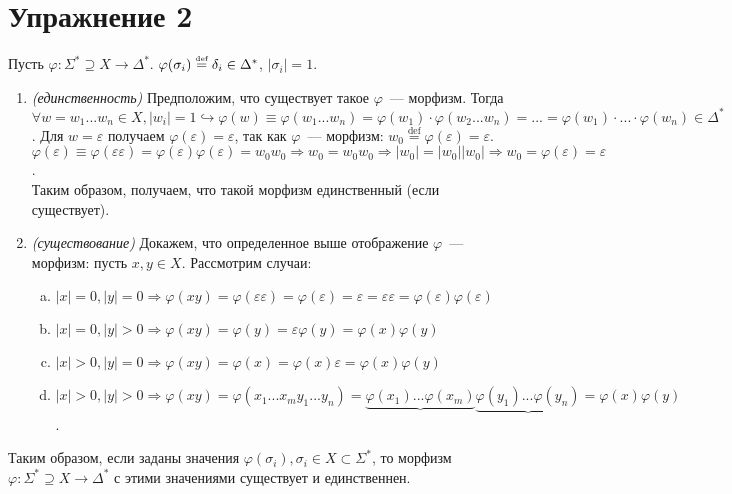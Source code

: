 \documentclass[a4paper]{article}
\begin{document}
\section*{Упражнение 2}
Пусть $\varphi\colon\Sigma^*\supseteq X\longrightarrow\Delta^*$. $\varphi(\sigma_i)\overset{\mbox{\tiny def}}{=}\delta_i\in\Delta^*$, $|\sigma_i|=1$.\newline
\begin{enumerate}
\item {\em (единственность)} Предположим, что существует такое $\varphi$~--- морфизм. Тогда $\forall w=w_1...w_n\in X, |w_i|=1\hookrightarrow\varphi(w)\equiv \varphi(w_1...w_n)=\varphi(w_1)\cdot\varphi(w_2...w_n)=...=\varphi(w_1)\cdot...\cdot\varphi(w_n)\in\Delta^*$. Для $w=\varepsilon$ получаем $\varphi(\varepsilon)=\varepsilon$, так как $\varphi$~--- морфизм: $w_0\overset{\mathrm{def}}{=}\varphi(\varepsilon)=\varepsilon$. $\varphi(\varepsilon)\equiv\varphi(\varepsilon\varepsilon)=\varphi(\varepsilon)\varphi(\varepsilon)=w_0w_0\Rightarrow w_0=w_0w_0\Rightarrow |w_0|=|w_0||w_0|\Rightarrow w_0=\varphi(\varepsilon)=\varepsilon$.
\\[5pt]
Таким образом, получаем, что такой морфизм единственный (если существует).
\item {\em (существование)} Докажем, что определенное выше отображение $\varphi$~--- морфизм: пусть $x,y\in X$. Рассмотрим случаи:
\begin{enumerate}[a.]
\item $|x|=0,|y|=0\Rightarrow\varphi(xy)=\varphi(\varepsilon\varepsilon)=\varphi(\varepsilon)=\varepsilon=\varepsilon\varepsilon=\varphi(\varepsilon)\varphi(\varepsilon)$
\item $|x|=0,|y|>0\Rightarrow\varphi(xy)=\varphi(y)=\varepsilon\varphi(y)=\varphi(x)\varphi(y)$
\item $|x|>0,|y|=0\Rightarrow\varphi(xy)=\varphi(x)=\varphi(x)\varepsilon=\varphi(x)\varphi(y)$
\item $|x|>0,|y|>0\Rightarrow\varphi(xy)=\varphi(x_1...x_my_1...y_n)=\underbrace{\varphi(x_1)...\varphi(x_m)}\underbrace{\varphi(y_1)...\varphi(y_n)}=\varphi(x)\varphi(y)$.
\end{enumerate}
\end{enumerate}
Таким образом, если заданы значения $\varphi(\sigma_i),\sigma_i\in X\subset\Sigma^*$, то морфизм $\varphi\colon \Sigma^*\supseteq X\longrightarrow\Delta^*$ с этими значениями существует и единственнен.
\end{document}
